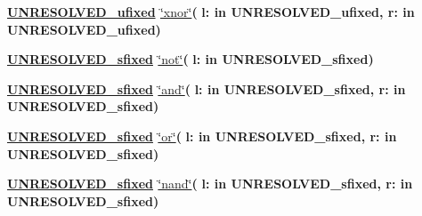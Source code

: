 \begin{DoxyCompactItemize}
\item 
{\bfseries {\bfseries {\bfseries \hyperlink{classfixed__pkg_ae78bc2b36d22f6abeac163955e8a587d}{U\+N\+R\+E\+S\+O\+L\+V\+E\+D\+\_\+ufixed}} \textcolor{vhdlchar}{ }}} \hyperlink{classfixed__pkg_aefc939e78bc810d7a62d73497889bd57}{\char`\"{}xnor\char`\"{}}{\bfseries  ( }{\bfseries \textcolor{vhdlchar}{l\+: }\textcolor{stringliteral}{in }\textcolor{vhdlchar}{U\+N\+R\+E\+S\+O\+L\+V\+E\+D\+\_\+ufixed}}{\bfseries  , \textcolor{vhdlchar}{r\+: }\textcolor{stringliteral}{in }\textcolor{vhdlchar}{U\+N\+R\+E\+S\+O\+L\+V\+E\+D\+\_\+ufixed}}{\bfseries  )} 
\item 
{\bfseries {\bfseries {\bfseries \hyperlink{classfixed__pkg_aa723b28a027c3c0f9bca02d75e8df4d6}{U\+N\+R\+E\+S\+O\+L\+V\+E\+D\+\_\+sfixed}} \textcolor{vhdlchar}{ }}} \hyperlink{classfixed__pkg_a71d578088f5405629f789b58771396d4}{\char`\"{}not\char`\"{}}{\bfseries  ( }{\bfseries \textcolor{vhdlchar}{l\+: }\textcolor{stringliteral}{in }\textcolor{vhdlchar}{U\+N\+R\+E\+S\+O\+L\+V\+E\+D\+\_\+sfixed}}{\bfseries  )} 
\item 
{\bfseries {\bfseries {\bfseries \hyperlink{classfixed__pkg_aa723b28a027c3c0f9bca02d75e8df4d6}{U\+N\+R\+E\+S\+O\+L\+V\+E\+D\+\_\+sfixed}} \textcolor{vhdlchar}{ }}} \hyperlink{classfixed__pkg_ae146b3c4b6fd51e6ceb503d114b7fa24}{\char`\"{}and\char`\"{}}{\bfseries  ( }{\bfseries \textcolor{vhdlchar}{l\+: }\textcolor{stringliteral}{in }\textcolor{vhdlchar}{U\+N\+R\+E\+S\+O\+L\+V\+E\+D\+\_\+sfixed}}{\bfseries  , \textcolor{vhdlchar}{r\+: }\textcolor{stringliteral}{in }\textcolor{vhdlchar}{U\+N\+R\+E\+S\+O\+L\+V\+E\+D\+\_\+sfixed}}{\bfseries  )} 
\item 
{\bfseries {\bfseries {\bfseries \hyperlink{classfixed__pkg_aa723b28a027c3c0f9bca02d75e8df4d6}{U\+N\+R\+E\+S\+O\+L\+V\+E\+D\+\_\+sfixed}} \textcolor{vhdlchar}{ }}} \hyperlink{classfixed__pkg_a20a079fb37dd2be4ea8bf5a767469b43}{\char`\"{}or\char`\"{}}{\bfseries  ( }{\bfseries \textcolor{vhdlchar}{l\+: }\textcolor{stringliteral}{in }\textcolor{vhdlchar}{U\+N\+R\+E\+S\+O\+L\+V\+E\+D\+\_\+sfixed}}{\bfseries  , \textcolor{vhdlchar}{r\+: }\textcolor{stringliteral}{in }\textcolor{vhdlchar}{U\+N\+R\+E\+S\+O\+L\+V\+E\+D\+\_\+sfixed}}{\bfseries  )} 
\item 
{\bfseries {\bfseries {\bfseries \hyperlink{classfixed__pkg_aa723b28a027c3c0f9bca02d75e8df4d6}{U\+N\+R\+E\+S\+O\+L\+V\+E\+D\+\_\+sfixed}} \textcolor{vhdlchar}{ }}} \hyperlink{classfixed__pkg_aa6aacc4825c558ca0161c9ed893ee57f}{\char`\"{}nand\char`\"{}}{\bfseries  ( }{\bfseries \textcolor{vhdlchar}{l\+: }\textcolor{stringliteral}{in }\textcolor{vhdlchar}{U\+N\+R\+E\+S\+O\+L\+V\+E\+D\+\_\+sfixed}}{\bfseries  , \textcolor{vhdlchar}{r\+: }\textcolor{stringliteral}{in }\textcolor{vhdlchar}{U\+N\+R\+E\+S\+O\+L\+V\+E\+D\+\_\+sfixed}}{\bfseries  )} 

\end{DoxyCompactItemize}
